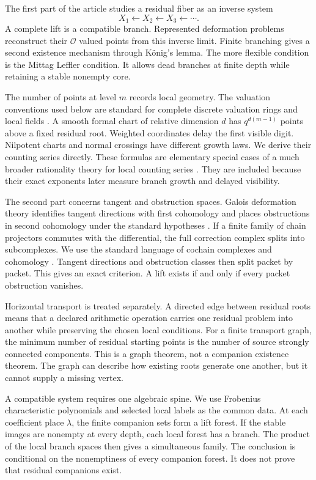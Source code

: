 \documentclass{aomart}
\theoremstyle{definition}
\theoremstyle{remark}
\newcommand{\OO}{\mathcal O}
\begin{document}
The first part of the article studies a residual fiber as an inverse system
\[
X_1\longleftarrow X_2\longleftarrow X_3\longleftarrow\cdots.
\]
A complete lift is a compatible branch. Represented deformation problems reconstruct their \(\OO\) valued points from this inverse limit. Finite branching gives a second existence mechanism through K\"onig's lemma. The more flexible condition is the Mittag Leffler condition. It allows dead branches at finite depth while retaining a stable nonempty core.

The number of points at level \(m\) records local geometry. The valuation conventions used below are standard for complete discrete valuation rings and local fields \cite{Serre1979}. A smooth formal chart of relative dimension \(d\) has \(q^{d(m-1)}\) points above a fixed residual root. Weighted coordinates delay the first visible digit. Nilpotent charts and normal crossings have different growth laws. We derive their counting series directly. These formulas are elementary special cases of a much broader rationality theory for local counting series \cite{Denef1984}. They are included because their exact exponents later measure branch growth and delayed visibility.

The second part concerns tangent and obstruction spaces. Galois deformation theory identifies tangent directions with first cohomology and places obstructions in second cohomology under the standard hypotheses \cite{Mazur1989,NeukirchSchmidtWingberg2008}. If a finite family of chain projectors commutes with the differential, the full correction complex splits into subcomplexes. We use the standard language of cochain complexes and cohomology \cite{Weibel1994}. Tangent directions and obstruction classes then split packet by packet. This gives an exact criterion. A lift exists if and only if every packet obstruction vanishes.

Horizontal transport is treated separately. A directed edge between residual roots means that a declared arithmetic operation carries one residual problem into another while preserving the chosen local conditions. For a finite transport graph, the minimum number of residual starting points is the number of source strongly connected components. This is a graph theorem, not a companion existence theorem. The graph can describe how existing roots generate one another, but it cannot supply a missing vertex.

A compatible system requires one algebraic spine. We use Frobenius characteristic polynomials and selected local labels as the common data. At each coefficient place \(\lambda\), the finite companion sets form a lift forest. If the stable images are nonempty at every depth, each local forest has a branch. The product of the local branch spaces then gives a simultaneous family. The conclusion is conditional on the nonemptiness of every companion forest. It does not prove that residual companions exist.
\end{document}
